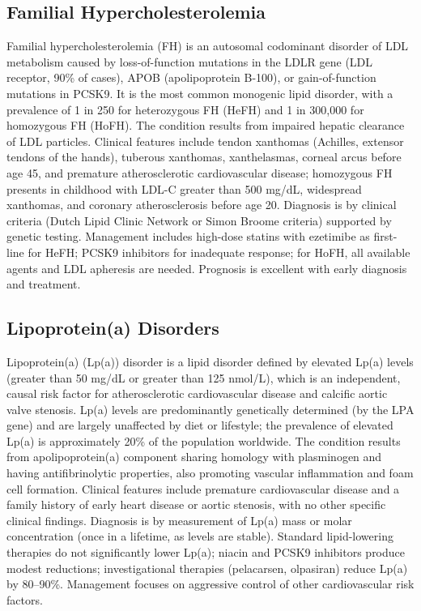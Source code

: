 \subsection{Familial Hypercholesterolemia}
\label{sec:Familial Hypercholesterolemia}
Familial hypercholesterolemia (FH) is an autosomal codominant disorder of LDL metabolism caused by loss-of-function mutations in the LDLR gene (LDL receptor, 90\% of cases), APOB (apolipoprotein B-100), or gain-of-function mutations in PCSK9. It is the most common monogenic lipid disorder, with a prevalence of 1 in 250 for heterozygous FH (HeFH) and 1 in 300,000 for homozygous FH (HoFH). The condition results from impaired hepatic clearance of LDL particles. Clinical features include tendon xanthomas (Achilles, extensor tendons of the hands), tuberous xanthomas, xanthelasmas, corneal arcus before age 45, and premature atherosclerotic cardiovascular disease; homozygous FH presents in childhood with LDL-C greater than 500 mg/dL, widespread xanthomas, and coronary atherosclerosis before age 20. Diagnosis is by clinical criteria (Dutch Lipid Clinic Network or Simon Broome criteria) supported by genetic testing. Management includes high-dose statins with ezetimibe as first-line for HeFH; PCSK9 inhibitors for inadequate response; for HoFH, all available agents and LDL apheresis are needed. Prognosis is excellent with early diagnosis and treatment.

\subsection{Lipoprotein(a) Disorders}
\label{sec:Lipoprotein(a) Disorders}
Lipoprotein(a) (Lp(a)) disorder is a lipid disorder defined by elevated Lp(a) levels (greater than 50 mg/dL or greater than 125 nmol/L), which is an independent, causal risk factor for atherosclerotic cardiovascular disease and calcific aortic valve stenosis. Lp(a) levels are predominantly genetically determined (by the LPA gene) and are largely unaffected by diet or lifestyle; the prevalence of elevated Lp(a) is approximately 20\% of the population worldwide. The condition results from apolipoprotein(a) component sharing homology with plasminogen and having antifibrinolytic properties, also promoting vascular inflammation and foam cell formation. Clinical features include premature cardiovascular disease and a family history of early heart disease or aortic stenosis, with no other specific clinical findings. Diagnosis is by measurement of Lp(a) mass or molar concentration (once in a lifetime, as levels are stable). Standard lipid-lowering therapies do not significantly lower Lp(a); niacin and PCSK9 inhibitors produce modest reductions; investigational therapies (pelacarsen, olpasiran) reduce Lp(a) by 80--90\%. Management focuses on aggressive control of other cardiovascular risk factors.

